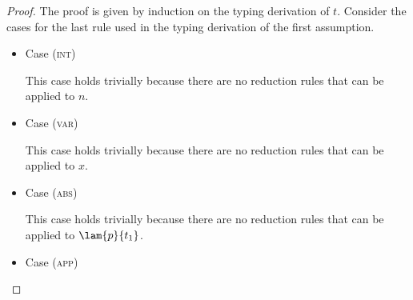 \begin{proof}
The proof is given by induction on the typing derivation of $t$.
Consider the cases for the last rule used in the typing derivation of the first assumption.
\\

\begin{itemize}
\item Case (\textsc{int})
\begin{center}
    \begin{minipage}{.25\linewidth}
    \end{minipage}
\end{center}
This case holds trivially because there are no reduction rules that can be applied to $n$.
\\

\item Case (\textsc{var})
\begin{center}
    \begin{minipage}{.35\linewidth}
    \end{minipage}
\end{center}
This case holds trivially because there are no reduction rules that can be applied to $x$.
\\

\item Case (\textsc{abs})
\begin{center}
    \begin{minipage}{.65\linewidth}
    \end{minipage}
\end{center}
This case holds trivially because there are no reduction rules that can be applied to $\lam{p}{t_1}$.
\\

\item Case (\textsc{app})
\begin{center}
    \begin{minipage}{.65\linewidth}
    \end{minipage}
\end{center}


\end{itemize}
\end{proof}
